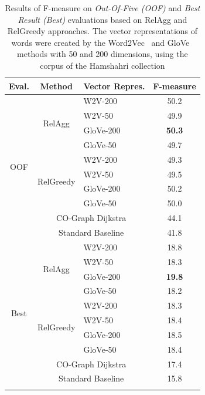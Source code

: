 \begin{table}[t!]
\begin{center}
\caption{Results of F-measure on \emph{Out-Of-Five (OOF)} and \emph{Best Result (Best)} evaluations based on RelAgg and RelGreedy approaches. The vector representations of words were created by the Word2Vec~\cite{mikolov2013efficient} and GloVe~\cite{pennington2014glove} methods with 50 and 200 dimensions, using the corpus of the Hamshahri collection} 
\vspace{-0.2cm}
\begin{tabular}{c c l c }
\hline
Eval. & Method & Vector Repres. & F-measure \\
\hline

\multirow{10}{*}{OOF} & \multirow{4}{*}{RelAgg} & W2V-200 & 50.2 \\
& & W2V-50 & 49.9 \\
& & GloVe-200 & \textbf{50.3} \\
& & GloVe-50 & 49.7 \\
\cline{3-4}
& \multirow{4}{*}{RelGreedy} & W2V-200 & 49.3 \\
& & W2V-50 &  49.5 \\
& & GloVe-200 & 50.2 \\
& & GloVe-50 & 50.0 \\
\cline{2-4}
& \multicolumn{2}{c}{CO-Graph Dijkstra} & 44.1\\
& \multicolumn{2}{c}{Standard Baseline} & 41.8\\
\hline
\hline
\multirow{10}{*}{Best} & \multirow{4}{*}{RelAgg} & W2V-200 & 18.8 \\
& & W2V-50 & 18.3 \\
& & GloVe-200 & \textbf{19.8} \\
& & GloVe-50 & 18.2 \\
\cline{3-4}
& \multirow{4}{*}{RelGreedy} & W2V-200 & 18.3 \\
& & W2V-50 &  18.4 \\
& & GloVe-200 & 18.5 \\
& & GloVe-50 & 18.4 \\
\cline{2-4}
& \multicolumn{2}{c}{CO-Graph Dijkstra} & 17.4\\
& \multicolumn{2}{c}{Standard Baseline} & 15.8\\
\hline
\label{table:results} 
\end{tabular}
\end{center}
\vspace{-1.0cm}
\end{table}

